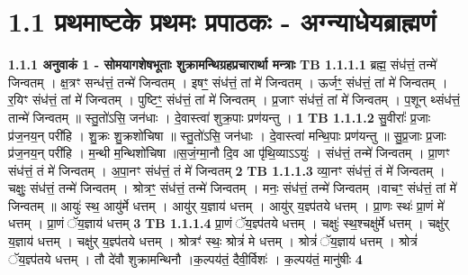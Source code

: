 \documentclass[17pt]{extarticle}
\begin{document}
     \section*{ 1.1     प्रथमाष्टके प्रथमः प्रपाठकः - अग्न्याधेयब्राह्मणं }
                \textbf{ 1.1.1     अनुवाकं   1 - सोमयागशेषभूताः शुक्रामन्थिग्रहप्रचारार्था मन्त्राः} \newline
                                \textbf{ TB 1.1.1.1} \newline
                  ब्रह्म॒ संध॑त्तं॒ तन्मे॑ जिन्वतम् । क्ष॒त्रꣳ सन्ध॑त्तं॒ तन्मे॑ जिन्वतम् । इषꣳ॒॒ संध॑त्तं॒ तां मे॑ जिन्वतम् । ऊर्जꣳ॒॒ संध॑त्तं॒ तां मे॑ जिन्वतम् । र॒यिꣳ संध॑त्तं॒ तां मे॑ जिन्वतम् । पुष्टिꣳ॒॒ संध॑त्तं॒ तां मे॑ जिन्वतम् । प्र॒जाꣳ संध॑त्तं॒ तां मे॑ जिन्वतम् । प॒शून् थ्संध॑त्तं॒ तान्मे॑ जिन्वतम् ॥ स्तु॒तो॑ऽसि॒ जन॑धाः । दे॒वास्त्वा॑ शुक्र॒पाः प्रण॑यन्तु । \textbf{ 1} \newline
                  \newline
                                \textbf{ TB 1.1.1.2} \newline
                  सु॒वीराः᳚ प्र॒जाः प्र॑ज॒नय॒न् परी॑हि । शु॒क्रः शु॒क्रशो॑चिषा ॥ स्तु॒तो॑ऽसि॒ जन॑धाः । दे॒वास्त्वा॑ मन्थि॒पाः प्रण॑यन्तु ॥ सु॒प्र॒जाः प्र॒जाः प्र॑ज॒नय॒न् परी॑हि । म॒न्थी म॒न्थिशो॑चिषा ॥स॒जं॒ग्मा॒नौ दि॒व आ पृ॑थि॒व्याऽऽयुः॑ । संध॑त्तं॒ तन्मे॑ जिन्वतम् । प्रा॒णꣳ संध॑त्तं॒ तं मे॑ जिन्वतम् । अ॒पा॒नꣳ संध॑त्तं॒ तं मे॑ जिन्वतम् \textbf{ 2} \newline
                  \newline
                                \textbf{ TB 1.1.1.3} \newline
                  व्या॒नꣳ संध॑त्तं॒ तं मे॑ जिन्वतम् । चक्षुः॒ संध॑त्तं॒ तन्मे॑ जिन्वतम् । श्रोत्रꣳ॒॒ संध॑त्तं॒ तन्मे॑ जिन्वतम् । मनः॒ संध॑त्तं॒ तन्मे॑ जिन्वतम् ।वाचꣳ॒॒ संध॑त्तं॒ तां मे॑ जिन्वतम् ॥ आयुः॑ स्थ॒ आयु॑र्मे धत्तम् । आयु॑र् य॒ज्ञाय॑ धत्तम् । आयु॑र् य॒ज्ञ्प॑तये धत्तम् । प्रा॒णः स्थः॑ प्रा॒णं मे॑ धत्तम् । प्रा॒णं ॅय॒ज्ञाय॑ धत्तम् \textbf{ 3} \newline
                  \newline
                                \textbf{ TB 1.1.1.4} \newline
                  प्रा॒णं ॅय॒ज्ञ्प॑तये धत्तम् । चक्षुः॑ स्थ॒श्चक्षु॑र्मे धत्तम् । चक्षु॑र् य॒ज्ञाय॑ धत्तम् । चक्षु॑र् य॒ज्ञ्प॑तये धत्तम् । श्रोत्रꣳ॑ स्थः॒ श्रोत्रं॑ मे धत्तम् । श्रोत्रं॑ ॅय॒ज्ञाय॑ धत्तम् । श्रोत्रं॑ ॅय॒ज्ञ्प॑तये धत्तम् । तौ दे॑वौ शुक्रामन्थिनौ ।क॒ल्पय॑तं॒ दैवी॒र्विशः॑ । क॒ल्पय॑तं॒ मानु॑षीः \textbf{ 4} \newline
                  \newline
\end{document}
